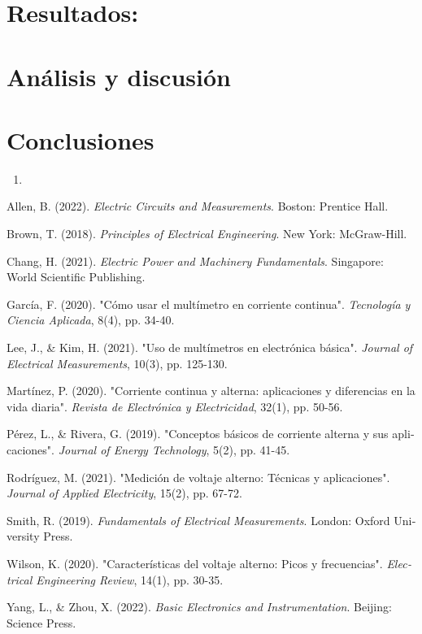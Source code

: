 \documentclass[twocolumn]{article}
\begin{document}
\section{Resultados:}

\section{Análisis y discusión}

\section{Conclusiones}
\begin{enumerate}
   \item 
\end{enumerate}


   
\begin{otherlanguage}{spanish}

\begin{thebibliography}{99}

 Allen, B. (2022). \textit{Electric Circuits and Measurements}. Boston: Prentice Hall.

 Brown, T. (2018). \textit{Principles of Electrical Engineering}. New York: McGraw-Hill.

 Chang, H. (2021). \textit{Electric Power and Machinery Fundamentals}. Singapore: World Scientific Publishing.

 García, F. (2020). "Cómo usar el multímetro en corriente continua". \textit{Tecnología y Ciencia Aplicada}, 8(4), pp. 34-40.

 Lee, J., \& Kim, H. (2021). "Uso de multímetros en electrónica básica". \textit{Journal of Electrical Measurements}, 10(3), pp. 125-130.

 Martínez, P. (2020). "Corriente continua y alterna: aplicaciones y diferencias en la vida diaria". \textit{Revista de Electrónica y Electricidad}, 32(1), pp. 50-56.

 Pérez, L., \& Rivera, G. (2019). "Conceptos básicos de corriente alterna y sus aplicaciones". \textit{Journal of Energy Technology}, 5(2), pp. 41-45.

 Rodríguez, M. (2021). "Medición de voltaje alterno: Técnicas y aplicaciones". \textit{Journal of Applied Electricity}, 15(2), pp. 67-72.

 Smith, R. (2019). \textit{Fundamentals of Electrical Measurements}. London: Oxford University Press.

 Wilson, K. (2020). "Características del voltaje alterno: Picos y frecuencias". \textit{Electrical Engineering Review}, 14(1), pp. 30-35.

 Yang, L., \& Zhou, X. (2022). \textit{Basic Electronics and Instrumentation}. Beijing: Science Press.

\end{thebibliography}
\end{otherlanguage}
\end{document}
